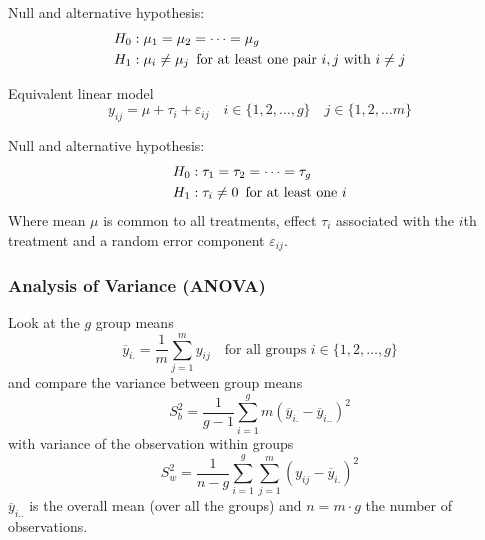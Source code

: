 \documentclass[11pt]{article}
\theoremstyle{definition}
\newcommand*\samplemean[1]{\overline{#1}}
\begin{document}
\vspace{1em}
\noindent
Null and alternative hypothesis:
\begin{align*}
	H_0 &: \mu_1 = \mu_2 = \dots = \mu_g\\
	H_1 &: \mu_i \neq \mu_j\hspace*{0.5em}\text{for at least one pair $i,j$ with $i\neq j$}
\end{align*}

\vspace{1em}
\noindent
Equivalent linear model
\begin{equation*}
	y_{ij} = \mu + \tau_i + \varepsilon_{ij}\quad i\in\{1,2,\dots,g\}\quad j\in\{1,2,\dots m\}
\end{equation*}

\vspace{1em}
\noindent
Null and alternative hypothesis:
\begin{align*}
	H_0 &: \tau_1 = \tau_2 = \dots = \tau_g\\
	H_1 &: \tau_i \neq 0\hspace*{0.5em}\text{for at least one $i$}
\end{align*}
Where mean $\mu$ is common to all treatments, effect $\tau_i$ associated with the $i$th treatment and a random error component $\varepsilon_{ij}$.

\subsubsection{Analysis of Variance (ANOVA)}
Look at the $g$ group means
\begin{equation*}
	\samplemean{y}_{i.} = \frac{1}{m}\sum_{j=1}^{m}y_{ij}\quad\text{for all groups $i\in\{1,2,\dots,g\}$}
\end{equation*}
and compare the variance between group means
\begin{equation*}
	S_b^2 = \frac{1}{g-1}\sum_{i=1}^{g}m\left(\samplemean{y}_{i.} - \samplemean{y}_{i..}\right)^2
\end{equation*}
with variance of the observation within groups
\begin{equation*}
	S_w^2 = \frac{1}{n-g}\sum_{i=1}^{g}\sum_{j=1}^{m}\left(y_{ij} - \samplemean{y}_{i.}\right)^2
\end{equation*}
$\samplemean{y}_{i..}$ is the overall mean (over all the groups) and $n=m\cdot g$ the number of observations.
\end{document}
